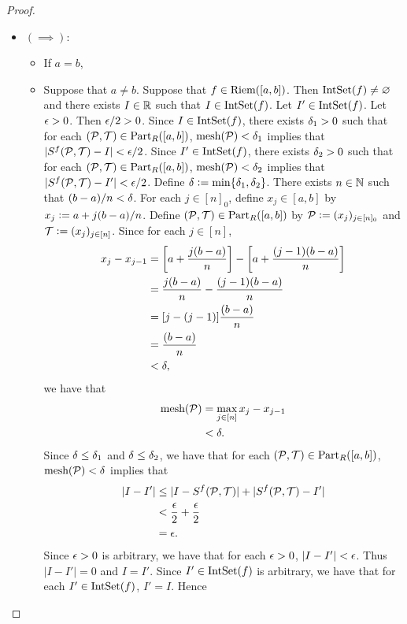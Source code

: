 \documentclass{book}
\begin{document}
	\begin{proof}\
		\begin{itemize}
			\item $(\implies)$: \\
			\begin{itemize}
				\item If $a=b$, 
				\item Suppose that $a \neq b$. Suppose that $f \in \text{Riem}([a,b])$. Then $\text{IntSet}(f) \neq \varnothing$ and there exists $I \in \mathbb{R}$ such that $I \in \text{IntSet}(f)$. Let $I' \in \text{IntSet}(f)$. Let $\epsilon > 0$. Then $\epsilon/2 > 0$. Since $I \in \text{IntSet}(f)$, there exists $\delta_1 > 0$ such that for each $(\mathcal{P},\mathcal{T}) \in \text{Part}_R([a,b])$, $\text{mesh}(\mathcal{P}) < \delta_1$ implies that $| S^f(\mathcal{P}, \mathcal{T}) - I| < \epsilon/2$. Since $I' \in \text{IntSet}(f)$, there exists $\delta_2 > 0$ such that for each $(\mathcal{P},\mathcal{T}) \in \text{Part}_R([a,b])$, $\text{mesh}(\mathcal{P}) < \delta_2$ implies that $| S^f(\mathcal{P}, \mathcal{T}) - I'| < \epsilon/2$. Define $\delta \vcentcolon= \min \{\delta_1, \delta_2\}$. There exists $n \in \mathbb{N}$ such that $(b-a)/n < \delta$. For each $j \in [n]_0$, define $x_j \in [a,b]$ by $x_j \vcentcolon= a + j(b-a)/n$. Define $(\mathcal{P}, \mathcal{T}) \in \text{Part}_R([a,b])$ by $\mathcal{P} \vcentcolon= (x_j)_{j \in [n]_0}$ and $\mathcal{T} \vcentcolon= (x_j)_{j \in [n]}$. Since for each $j \in [n]$, 
				\begin{align*}
					x_j - x_{j-1} 
					& = \bigg[a + \frac{j(b-a)}{n} \bigg] - \bigg[a + \frac{(j-1)(b-a)}{n} \bigg] \\
					& = \frac{j(b-a)}{n} - \frac{(j-1)(b-a)}{n} \\
					& = [j - (j-1)]\frac{(b-a)}{n} \\
					& = \frac{(b-a)}{n} \\
					& < \delta,
				\end{align*}
				we have that
				\begin{align*}
					\text{mesh}(\mathcal{P})
					& = \max\limits_{j \in [n]} x_j - x_{j-1} \\
					& < \delta. 
				\end{align*}
				Since $\delta \leq \delta_1$ and $\delta \leq \delta_2$, we have that for each $(\mathcal{P},\mathcal{T}) \in \text{Part}_R([a,b])$, $\text{mesh}(\mathcal{P}) < \delta$ implies that 
				\begin{align*}
					|I - I'| 
					& \leq |I - S^f(\mathcal{P}, \mathcal{T})| + | S^f(\mathcal{P}, \mathcal{T}) - I'| \\
					& < \frac{\epsilon}{2} + \frac{\epsilon}{2} \\
					& = \epsilon. 
				\end{align*} 
				Since $\epsilon > 0$ is arbitrary, we have that for each $\epsilon > 0$, $|I - I'| < \epsilon$. Thus $|I - I'| = 0$ and $I = I'$. Since $I' \in \text{IntSet}(f)$ is arbitrary, we have that for each $I' \in \text{IntSet}(f)$, $I' = I$. Hence

\end{itemize}
\end{itemize}
\end{proof}
\end{document}

